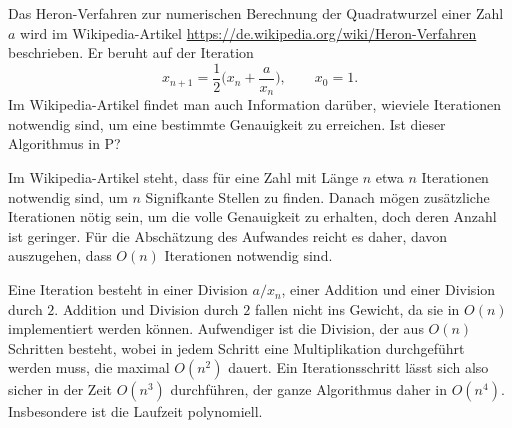 Das Heron-Verfahren zur numerischen Berechnung der Quadratwurzel einer Zahl
$a$ wird im Wikipedia-Artikel
\url{https://de.wikipedia.org/wiki/Heron-Verfahren}
beschrieben.
Er beruht auf der Iteration
\[
x_{n+1}= \frac12\biggl(x_n+\frac{a}{x_n}\biggr),\qquad x_0=1.
\]
Im Wikipedia-Artikel findet man auch Information darüber, wieviele
Iterationen notwendig sind, um eine bestimmte Genauigkeit zu erreichen.
Ist dieser Algorithmus in P?

\begin{loesung}
Im Wikipedia-Artikel steht, dass für eine Zahl mit Länge $n$ etwa $n$
Iterationen notwendig sind, um $n$ Signifkante Stellen zu finden.
Danach mögen zusätzliche Iterationen nötig sein, um die volle Genauigkeit
zu erhalten, doch deren Anzahl ist geringer.
Für die Abschätzung des Aufwandes reicht es daher, davon auszugehen, dass
$O(n)$ Iterationen notwendig sind.

Eine Iteration besteht in einer Division $a/x_n$, einer Addition und
einer Division durch $2$. 
Addition und Division durch $2$
fallen nicht ins Gewicht, da sie in $O(n)$
implementiert werden können.
Aufwendiger ist die Division, der aus $O(n)$ Schritten besteht, wobei
in jedem Schritt eine Multiplikation durchgeführt werden muss, die
maximal $O(n^2)$ dauert.
Ein Iterationsschritt lässt sich also sicher in der Zeit $O(n^3)$ durchführen,
der ganze Algorithmus daher in $O(n^4)$.
Insbesondere ist die Laufzeit polynomiell.
\end{loesung}
